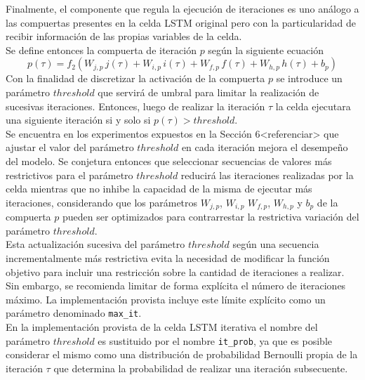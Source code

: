 \documentclass{article}
\begin{document}
	Finalmente, el componente que regula la ejecución de iteraciones es uno análogo a las compuertas presentes en la celda LSTM original pero con la particularidad de recibir información de las propias variables de la celda. \\
	Se define entonces la compuerta de iteración $p$ según la siguiente ecuación
	\begin{equation*}
	p(\tau) = f_2(W_{j, p} \, j(\tau) + W_{i, p} \, i(\tau) + W_{f, p} \, f(\tau) + W_{h, p} \, h(\tau) + b_p)
	\end{equation*}
	Con la finalidad de discretizar la activación de la compuerta $p$ se introduce un parámetro $threshold$ que servirá de umbral para limitar la realización de sucesivas iteraciones. Entonces, luego de realizar la iteración $\tau$ la celda ejecutara una siguiente iteración si y solo si $p(\tau) > threshold$.\\
	Se encuentra en los experimentos expuestos en la Sección 6<referenciar> que ajustar el valor del parámetro $threshold$ en cada iteración mejora el desempeño del modelo. Se conjetura entonces que seleccionar secuencias de valores más restrictivos para el parámetro $threshold$ reducirá las iteraciones realizadas por la celda mientras que no inhibe la capacidad de la misma de ejecutar más iteraciones, considerando que los parámetros $W_{j, p}$, $W_{i, p}$ $W_{f, p}$, $W_{h, p}$ y $b_p$ de la compuerta $p$ pueden ser optimizados para contrarrestar la restrictiva variación del parámetro $threshold$.\\
	Esta actualización sucesiva del parámetro $threshold$ según una secuencia incrementalmente más restrictiva evita la necesidad de modificar la función objetivo para incluir una restricción sobre la cantidad de iteraciones a realizar. Sin embargo, se recomienda limitar de forma explícita el número de iteraciones máximo. La implementación provista incluye este límite explícito como un parámetro denominado \texttt{max\_it}.\\
	En la implementación provista de la celda LSTM iterativa el nombre del parámetro $threshold$ es sustituido por el nombre \texttt{it\_prob}, ya que es posible considerar el mismo como una distribución de probabilidad Bernoulli propia de la iteración $\tau$ que determina la probabilidad de realizar una iteración subsecuente.\\
	
\end{document}
